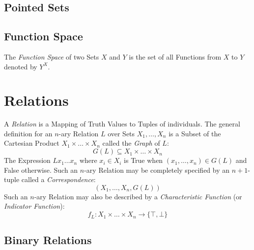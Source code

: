 \documentclass{article}
\begin{document}
\subsection{Pointed Sets}

\subsection{Function Space}\label{subsec:function_space}

The \emph{Function Space} of two Sets $X$ and $Y$ is the set of all
Functions from $X$ to $Y$ denoted by $Y^X$.

\section{Relations}\label{sec:set_relations}

A \emph{Relation} is a Mapping of Truth Values to Tuples of
individuals. The general definition for an $n$-ary Relation $L$ over
Sets $X_1, \ldots, X_n$ is a Subset of the Cartesian Product $X_1
\times \ldots \times X_n$ called the \emph{Graph} of $L$:
\[
    G(L) \subseteq X_1 \times \ldots \times X_n
\]
The Expression $L x_1 \ldots x_n$ where $x_i \in X_i$ is True when
$(x_1, \ldots, x_n) \in G(L)$ and False otherwise. Such an $n$-ary
Relation may be completely specified by an $n + 1$-tuple called a
\emph{Correspondence}:
\[
    (X_1, \ldots, X_n, G(L))
\]
Such an $n$-ary Relation may also be described by a
\emph{Characteristic Function} (or \emph{Indicator Function}): %
\[
    f_L : X_1 \times \ldots \times X_n \rightarrow \{\top,\bot\}
\]

\subsection{Binary Relations}\label{subsec:binary_relations}
\end{document}
